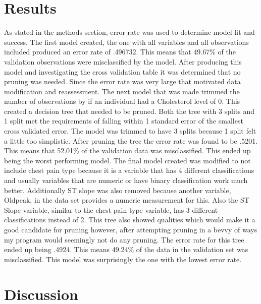 \documentclass[12pt]{article}
\begin{document}
\section{Results}
\label{sec:resu}
As stated in the methods section, error rate was used to determine model fit and success.
The first model created, the one with all variables and all observations included produced an  error rate of .496732. This means that 49.67\% of the validation observations were misclassified by the model. After producing this model and investigating the cross validation table it was determined that no pruning was needed. Since the error rate was very large that motivated data modification and reassessment.
The next model that was made trimmed the number of observations by if an individual had a Cholesterol level of 0. This created a decision tree that needed to be pruned. Both the tree with 3 splits and 1 split met the requirements of falling within 1 standard error of the smallest cross validated error. The model was trimmed to have 3 splits because 1 split felt a little too simplistic. After pruning the tree the error rate was found to be .5201. This means that 52.01\% of the validation data was misclassified. This ended up being the worst performing model.
The final model created was modified to not include chest pain type because it is a variable that has 4 different classifications and usually variables that are numeric or have binary classification work much better. Additionally ST slope was also removed because another variable, Oldpeak, in the data set provides a numeric measurement for this. Also the ST Slope variable, similar to the chest pain type variable, has 3 different classifications instead of 2. This tree also showed qualities which would make it a good candidate for pruning however, after attempting pruning in a bevvy of ways my program would seemingly not do any pruning. The error rate for this tree ended up being .4924. This means 49.24\% of the data in the validation set was misclassified. This model was surprisingly the one with the lowest error rate.

\section{Discussion}
\label{sec:disc}
\end{document}
